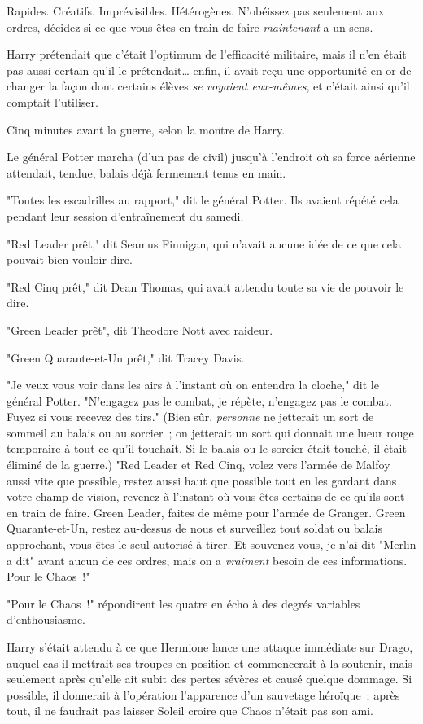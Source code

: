 Rapides. Créatifs. Imprévisibles. Hétérogènes. N'obéissez pas seulement aux ordres, décidez si ce que vous êtes en train de faire \emph{maintenant} a un sens.

Harry prétendait que c'était l'optimum de l'efficacité militaire, mais il n'en était pas aussi certain qu'il le prétendait… enfin, il avait reçu une opportunité en or de changer la façon dont certains élèves \emph{se voyaient eux-mêmes}, et c'était ainsi qu'il comptait l'utiliser.

Cinq minutes avant la guerre, selon la montre de Harry.

Le général Potter marcha (d'un pas de civil) jusqu'à l'endroit où sa force aérienne attendait, tendue, balais déjà fermement tenus en main.

"Toutes les escadrilles au rapport," dit le général Potter. Ils avaient répété cela pendant leur session d'entraînement du samedi.

"Red Leader prêt," dit Seamus Finnigan, qui n'avait aucune idée de ce que cela pouvait bien vouloir dire.

"Red Cinq prêt," dit Dean Thomas, qui avait attendu toute sa vie de pouvoir le dire.

"Green Leader prêt", dit Theodore Nott avec raideur.

"Green Quarante-et-Un prêt," dit Tracey Davis.

"Je veux vous voir dans les airs à l'instant où on entendra la cloche," dit le général Potter. "N'engagez pas le combat, je répète, n'engagez pas le combat. Fuyez si vous recevez des tirs." (Bien sûr, \emph{personne} ne jetterait un sort de sommeil au balais ou au sorcier~; on jetterait un sort qui donnait une lueur rouge temporaire à tout ce qu'il touchait. Si le balais ou le sorcier était touché, il était éliminé de la guerre.) "Red Leader et Red Cinq, volez vers l'armée de Malfoy aussi vite que possible, restez aussi haut que possible tout en les gardant dans votre champ de vision, revenez à l'instant où vous êtes certains de ce qu'ils sont en train de faire. Green Leader, faites de même pour l'armée de Granger. Green Quarante-et-Un, restez au-dessus de nous et surveillez tout soldat ou balais approchant, vous êtes le seul autorisé à tirer. Et souvenez-vous, je n'ai dit "Merlin a dit" avant aucun de ces ordres, mais on a \emph{vraiment} besoin de ces informations. Pour le Chaos~!"

"Pour le Chaos~!" répondirent les quatre en écho à des degrés variables d'enthousiasme.

Harry s'était attendu à ce que Hermione lance une attaque immédiate sur Drago, auquel cas il mettrait ses troupes en position et commencerait à la soutenir, mais seulement après qu'elle ait subit des pertes sévères et causé quelque dommage. Si possible, il donnerait à l'opération l'apparence d'un sauvetage héroïque~; après tout, il ne faudrait pas laisser Soleil croire que Chaos n'était pas son ami.

